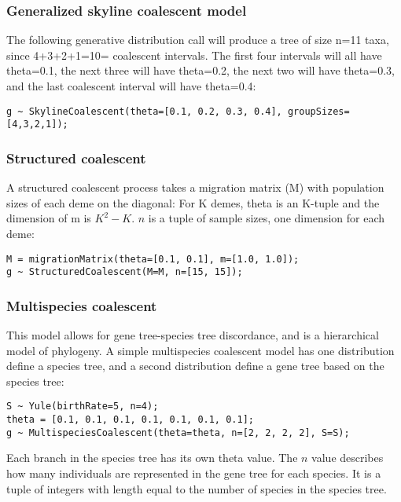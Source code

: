 \documentclass[oneside]{article}
\begin{document}
\subsubsection{Generalized skyline coalescent model}

The following generative distribution call will produce a tree of size
n=11 taxa, since 4+3+2+1=10= coalescent intervals.
The first four intervals will all have theta=0.1, the next three will
have theta=0.2, the next two will have theta=0.3, and the last
coalescent interval will have theta=0.4:

\begin{verbatim}
g ~ SkylineCoalescent(theta=[0.1, 0.2, 0.3, 0.4], groupSizes=[4,3,2,1]);
\end{verbatim}

\subsubsection{Structured coalescent}

A structured coalescent process takes a migration matrix (M) with
population sizes of each deme on the diagonal:
For K demes, theta is an K-tuple and the dimension of m is $K^2 -
K$. $n$ is a tuple of sample sizes, one dimension for each deme:

\begin{verbatim}
M = migrationMatrix(theta=[0.1, 0.1], m=[1.0, 1.0]);
g ~ StructuredCoalescent(M=M, n=[15, 15]);
\end{verbatim}

\subsubsection{Multispecies coalescent}

This model allows for gene tree-species tree discordance, and is a
hierarchical model of phylogeny.
A simple multispecies coalescent model has one distribution define a
species tree, and a second distribution define a gene tree based on
the species tree:

\begin{verbatim}
S ~ Yule(birthRate=5, n=4);
theta = [0.1, 0.1, 0.1, 0.1, 0.1, 0.1, 0.1];
g ~ MultispeciesCoalescent(theta=theta, n=[2, 2, 2, 2], S=S);
\end{verbatim}

Each branch in the species tree has its own theta value.
The $n$ value describes how many individuals are represented in
the gene tree for each species.
It is a tuple of integers with length equal to the number of species
in the species tree.
\end{document}
